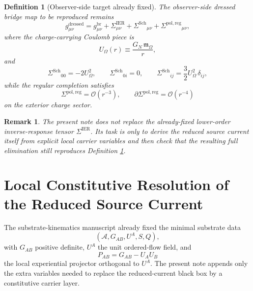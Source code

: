 \documentclass[11pt]{article}
\newcommand{\Sub}{\mathcal{A}}
\newcommand{\ProjSub}{P}
\newcommand{\CoulPot}{U_\Omega}
\newcommand{\HamChargeOmega}{\mathfrak m_\Omega}
\newcommand{\SigmaIER}{\Sigma^{\mathrm{IER}}}
\newcommand{\SigmaDressSch}{\Sigma^{\mathrm{Sch}}}
\newcommand{\SigmaRegPol}{\Sigma^{\mathrm{pol,reg}}}
\newtheorem{definition}{Definition}
\newtheorem{remark}{Remark}
\begin{document}
\begin{definition}[Observer-side target already fixed]
\label{def:target}
The observer-side dressed bridge map to be reproduced remains
\begin{equation}
g_{\mu\nu}^{\mathrm{dressed}}
=
g_{\mu\nu}^{\mathrm{br}}
+\SigmaIER_{\mu\nu}
+\SigmaDressSch{}_{\mu\nu}
+\SigmaRegPol{}_{\mu\nu},
\label{eq:targetmetric}
\end{equation}
where the charge-carrying Coulomb piece is
\begin{equation}
\CoulPot(r)\equiv \frac{G_N\,\HamChargeOmega}{r},
\label{eq:coulpot}
\end{equation}
and
\begin{equation}
\SigmaDressSch{}_{00}=-2\CoulPot^2,
\qquad
\SigmaDressSch{}_{0i}=0,
\qquad
\SigmaDressSch{}_{ij}=\frac32\CoulPot^2\,\delta_{ij},
\label{eq:schdress}
\end{equation}
while the regular completion satisfies
\begin{equation}
\SigmaRegPol=\mathcal O(r^{-3}),
\qquad
\partial\SigmaRegPol=\mathcal O(r^{-4})
\label{eq:reg}
\end{equation}
on the exterior charge sector.
\end{definition}

\begin{remark}
The present note does not replace the already-fixed lower-order inverse-response tensor \(\SigmaIER\). Its task is only to derive the reduced source current itself from explicit local carrier variables and then check that the resulting full elimination still reproduces Definition \ref{def:target}.
\end{remark}

\section{Local Constitutive Resolution of the Reduced Source Current}

The substrate-kinematics manuscript already fixed the minimal substrate data
\[
(\Sub,G_{AB},U^A,S,Q),
\]
with \(G_{AB}\) positive definite, \(U^A\) the unit ordered-flow field, and
\begin{equation}
\ProjSub_{AB}=G_{AB}-U_AU_B
\label{eq:projector}
\end{equation}
the local experiential projector orthogonal to \(U^A\). The present note appends only the extra variables needed to replace the reduced-current black box by a constitutive carrier layer.
\end{document}
